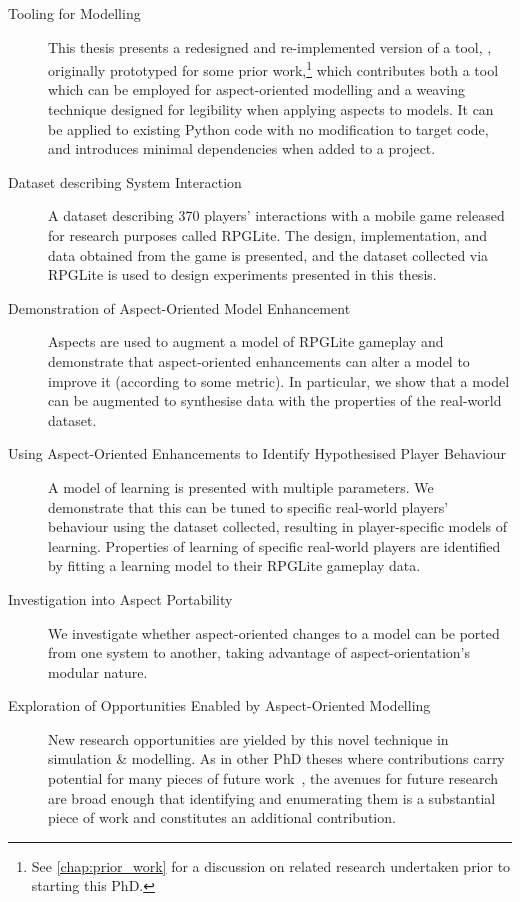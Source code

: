 \begin{description}
  \item[Tooling for \AspectOriented{} Modelling] This thesis presents a redesigned
    and re-implemented version of a tool, \pdsf{}, originally
    prototyped for some prior work,\footnote{See \cref{chap:prior_work} for a
    discussion on related research undertaken prior to starting this PhD.} which contributes both a tool which can
    be employed for aspect-oriented modelling and a weaving technique designed
    for legibility when applying aspects to models. It can be applied to
    existing Python code with no modification to target code, and introduces
    minimal dependencies when added to a project.
  \item[Dataset describing \SocioTechnical System Interaction] A dataset
    describing 370 players' interactions with a mobile game released for
    research purposes called RPGLite. The design, implementation, and data
    obtained from the game is presented, and the dataset collected via RPGLite
    is used to design experiments presented in this thesis.
  \item[Demonstration of Aspect-Oriented Model Enhancement] Aspects are used to
    augment a model of RPGLite gameplay and demonstrate that aspect-oriented
    enhancements can alter a model to improve it (according to some metric). In
    particular, we show that a model can be augmented to synthesise data with
    the properties of the real-world dataset.
  \item[Using Aspect-Oriented Enhancements to Identify Hypothesised Player
    Behaviour] A model of learning is presented with multiple parameters. We
    demonstrate that this can be tuned to specific real-world players' behaviour
    using the dataset collected, resulting in player-specific models of
    learning. Properties of learning of specific real-world players are
    identified by fitting a learning model to their RPGLite gameplay data.
  \item[Investigation into Aspect Portability] We investigate whether
    aspect-oriented changes to a model can be ported from one system to another,
    taking advantage of aspect-orientation's modular nature.
  \item[Exploration of Opportunities Enabled by Aspect-Oriented Modelling]
    New research opportunities are yielded by this novel technique in simulation
    \& modelling. As in other PhD theses where contributions carry potential for
    many pieces of future work~\cite{marsh1994formalising}, the avenues for
    future research are broad enough that identifying and enumerating them is a
    substantial piece of work and constitutes an additional contribution.
\end{description}



